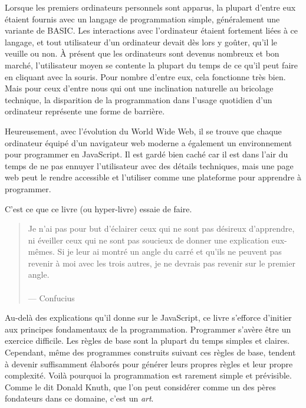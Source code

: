 \documentclass{FramateX}
\begin{document}
Lorsque les premiers ordinateurs personnels sont apparus, la plupart
d'entre eux étaient fournis avec un langage de programmation simple,
généralement une variante de BASIC. Les interactions avec l'ordinateur
étaient fortement liées à ce langage, et tout utilisateur d'un
ordinateur devait dès lors y goûter, qu'il le veuille ou non. À présent
que les ordinateurs sont devenus nombreux et bon marché, l'utilisateur
moyen se contente la plupart du temps de ce qu'il peut faire en cliquant
avec la souris. Pour nombre d'entre eux, cela fonctionne très bien. Mais
pour ceux d'entre nous qui ont une inclination naturelle au bricolage
technique, la disparition de la programmation dans l'usage quotidien
d'un ordinateur représente une forme de barrière.

Heureusement, avec l'évolution du World Wide Web, il se trouve que
chaque ordinateur équipé d'un navigateur web moderne a également un
environnement pour programmer en JavaScript. Il est gardé bien caché car
il est dans l'air du temps de ne pas ennuyer l'utilisateur avec des
détails techniques, mais une page web peut le rendre accessible et
l'utiliser comme une plateforme pour apprendre à programmer.

C'est ce que ce livre (ou hyper-livre) essaie de faire.

\begin{center}\end{center}

\begin{quote}
Je n'ai pas pour but d'éclairer ceux qui ne sont pas désireux
d'apprendre, ni éveiller ceux qui ne sont pas soucieux de donner une
explication eux-mêmes. Si je leur ai montré un angle du carré et qu'ils
ne peuvent pas revenir à moi avec les trois autres, je ne devrais pas
revenir sur le premier angle.\\\\--- Confucius
\end{quote}
Au-delà des explications qu'il donne sur le JavaScript, ce livre
s'efforce d'initier aux principes fondamentaux de la programmation.
Programmer s'avère être un exercice difficile. Les règles de base sont
la plupart du temps simples et claires. Cependant, même des programmes
construits suivant ces règles de base, tendent à devenir suffisamment
élaborés pour générer leurs propres règles et leur propre complexité.
Voilà pourquoi la programmation est rarement simple et prévisible. Comme
le dit Donald Knuth, que l'on peut considérer comme un des pères
fondateurs dans ce domaine, c'est un \emph{art}.
\end{document}
